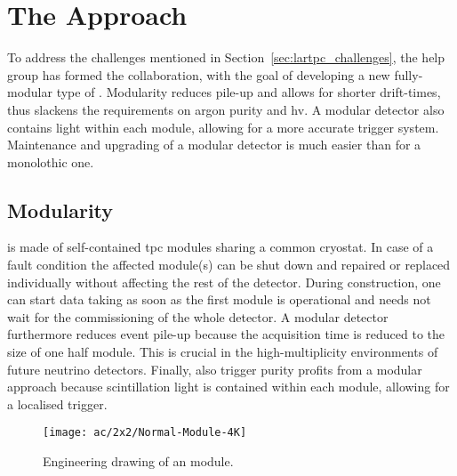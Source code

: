 \section{The \AC{} Approach}
\label{sec:ac_argoncube}

To address the challenges mentioned in Section~\ref{sec:lartpc_challenges}, the \gls{help} group has formed the \AC{} collaboration, with the goal of developing a new fully-modular type of \lartpc{}.
Modularity reduces pile-up and allows for shorter drift-times, thus slackens the requirements on argon purity and \gls{hv}.
A modular detector also contains light within each module, allowing for a more accurate trigger system.
Maintenance and upgrading of a modular detector is much easier than for a monolothic one.


\subsection{Modularity}
\label{sec:ac_argoncube_mod}

\AC{} is made of self-contained \gls{tpc} modules sharing a common cryostat.
In case of a fault condition the affected module(s) can be shut down and repaired or replaced individually without affecting the rest of the detector.
During construction, one can start data taking as soon as the first module is operational and needs not wait for the commissioning of the whole detector.
A modular detector furthermore reduces event pile-up because the acquisition time is reduced to the size of one half module.
This is crucial in the high-multiplicity environments of future \lar{} neutrino detectors.
Finally, also trigger purity profits from a modular approach because scintillation light is contained within each module, allowing for a localised trigger.

\begin{figure}[htb]
	\centering
	\texttt{[image: ac/2x2/Normal-Module-4K]}
	\caption[\AC{} module schematic]{%
		Engineering drawing of an \AC{} module.
	}
	\label{fig:ac_module}
\end{figure}

